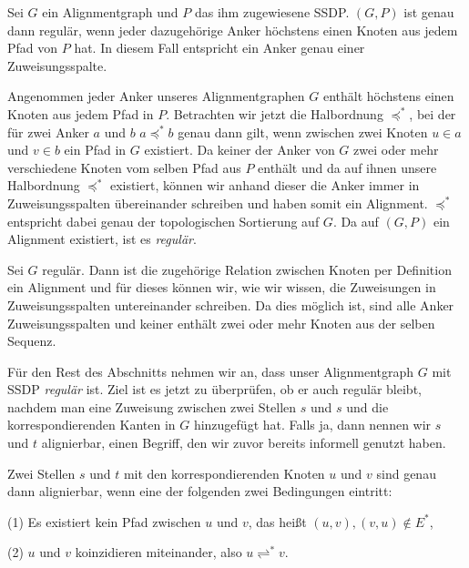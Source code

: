 \begin{lemma}
	Sei $G$ ein Alignmentgraph und $P$ das ihm zugewiesene SSDP. $(G,P)$ ist genau dann regulär, wenn jeder dazugehörige Anker höchstens einen Knoten aus jedem Pfad von $P$ hat. In diesem Fall entspricht ein Anker genau einer Zuweisungsspalte.
\end{lemma}

\begin{beweis}
	\bewhin Angenommen jeder Anker unseres Alignmentgraphen $G$ enthält höchstens einen Knoten aus jedem Pfad in $P$. Betrachten wir jetzt die Halbordnung $\preceq^{*}$, bei der für zwei Anker $a$ und $b$ $a \preceq^{*} b$ genau dann gilt, wenn zwischen zwei Knoten $u \in a$ und $v \in b$ ein Pfad in $G$ existiert. Da keiner der Anker von $G$ zwei oder mehr verschiedene Knoten vom selben Pfad aus $P$ enthält und da auf ihnen unsere Halbordnung $\preceq^{*}$ existiert, können wir anhand dieser die Anker immer in Zuweisungsspalten übereinander schreiben und haben somit ein Alignment. $\preceq^{*}$ entspricht dabei genau der topologischen Sortierung auf $G$. Da auf $(G,P)$ ein Alignment existiert, ist es \emph{regulär}.
	
	\bewrueck Sei $G$ regulär. Dann ist die zugehörige Relation zwischen Knoten per Definition ein Alignment und für dieses können wir, wie wir wissen, die Zuweisungen in Zuweisungsspalten untereinander schreiben. Da dies möglich ist, sind alle Anker Zuweisungsspalten und keiner enthält zwei oder mehr Knoten aus der selben Sequenz.
\end{beweis}

Für den Rest des Abschnitts nehmen wir an, dass unser Alignmentgraph $G$ mit SSDP \emph{regulär} ist. Ziel ist es jetzt zu überprüfen, ob er auch regulär bleibt, nachdem man eine Zuweisung zwischen zwei Stellen $s$ und $s$ und die korrespondierenden Kanten in $G$ hinzugefügt hat. Falls ja, dann nennen wir $s$ und $t$ alignierbar, einen Begriff, den wir zuvor bereits informell genutzt haben.

\begin{lemma}
	Zwei Stellen $s$ und $t$ mit den korrespondierenden Knoten $u$ und $v$ sind genau dann alignierbar, wenn eine der folgenden zwei Bedingungen eintritt:
	
	(1) Es existiert kein Pfad zwischen $u$ und $v$, das heißt $(u,v),(v,u) \notin E^{*}$,
	
	(2) $u$ und $v$ koinzidieren miteinander, also $u \rightleftharpoons^{*} v$.
\end{lemma}

